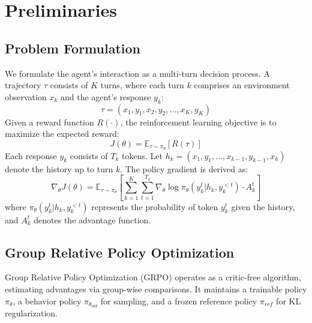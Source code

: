 \documentclass[11pt]{article}
\begin{document}
\section{Preliminaries}
\subsection{Problem Formulation}
We formulate the agent's interaction as a multi-turn decision process. A trajectory $\tau$ consists of $K$ turns, where each turn $k$ comprises an environment observation $x_k$ and the agent's response $y_k$:
\begin{equation}
    \tau = (x_1, y_1, x_2, y_2, \ldots, x_K, y_K)
\end{equation}
Given a reward function $R(\cdot)$, the reinforcement learning objective is to maximize the expected reward:
\begin{equation}
    J(\theta) = \mathbb{E}_{\tau \sim \pi_{\theta}} [R(\tau)]
\end{equation}
Each response $y_k$ consists of $T_k$ tokens. Let $h_k = (x_1, y_1, \ldots, x_{k-1}, y_{k-1}, x_k)$ denote the history up to turn $k$. The policy gradient is derived as:
\begin{equation}
    \nabla_{\theta} J(\theta) \!\!=\!\! \mathbb{E}_{\tau \sim \pi_{\theta}} \!\!\left[ \sum_{k=1}^{K} \!\! \sum_{t=1}^{T_k} \!\! \nabla_{\theta} \log \pi_{\theta}(y_k^t | h_k, y_k^{<t}) \!\cdot\! A_k^t \right]
\end{equation}
where $\pi_{\theta}(y_k^t | h_k, y_k^{<t})$ represents the probability of token $y_k^t$ given the history, and $A_k^t$ denotes the advantage function.

\subsection{Group Relative Policy Optimization}
Group Relative Policy Optimization (GRPO) \cite{shao2024deepseekmath} operates as a critic-free algorithm, estimating advantages via group-wise comparisons. It maintains a trainable policy $\pi_{\theta}$, a behavior policy $\pi_{\theta_{old}}$ for sampling, and a frozen reference policy $\pi_{ref}$ for KL regularization.
\end{document}

